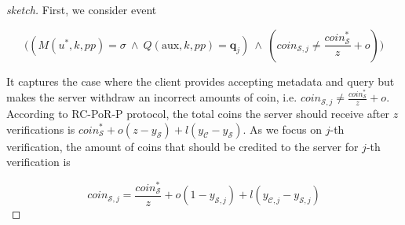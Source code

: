 \begin{proof}[sketch]
  First, we consider event 
  
   $$\Big((M(u^{\scriptscriptstyle *},k,{pp})= \sigma \  \wedge \ Q(\text{aux},k, {pp})= \bm{q}_{\scriptscriptstyle j})\ \wedge \
(coin_{\scriptscriptstyle\mathcal{S},j}\neq  \frac{coin_{\scriptscriptstyle\mathcal S}^{\scriptscriptstyle*}}{z}+o)\Big)$$
  
  
  It captures the case where the client provides  accepting metadata and query  but makes the server withdraw an incorrect amounts of coin, i.e. $coin_{\scriptscriptstyle\mathcal{S},j}\neq  \frac{coin_{\scriptscriptstyle\mathcal S}^{\scriptscriptstyle*}}{z}+o$. According to  RC-PoR-P protocol, the total coins the server should receive after $z$ verifications is $coin^{\scriptscriptstyle *}_{\scriptscriptstyle\mathcal S}+o(z-y_{\scriptscriptstyle\mathcal S})+l(y_{\scriptscriptstyle\mathcal C}-y_{\scriptscriptstyle\mathcal S})$. As we focus on  $j$-th verification, the amount of  coins that should be credited to the server for $j$-th verification is
  
  \begin{equation}\label{equ::what-server-recives-in-j-2}
   coin_{\scriptscriptstyle\mathcal{S},j}=\frac{coin^{\scriptscriptstyle *}_{\scriptscriptstyle\mathcal S}}{z}+o(1-y_{\scriptscriptstyle\mathcal {S},j})+l(y_{\scriptscriptstyle\mathcal {C},j}-y_{\scriptscriptstyle\mathcal {S},j})
     \end{equation}
  
  
  

\end{proof}
